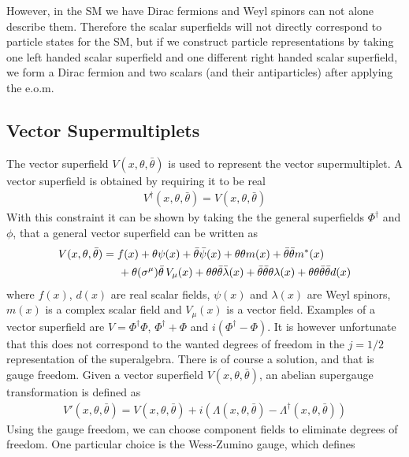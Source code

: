 However, in the SM we have Dirac fermions and Weyl spinors can not alone describe them. Therefore the scalar superfields will not directly correspond to particle states for the SM, but if we construct particle representations by taking one left handed scalar superfield and one different right handed scalar superfield, we form a Dirac fermion and two scalars (and their antiparticles) after applying the e.o.m.

\subsection{Vector Supermultiplets}
The vector superfield $V(x,\theta,\bar{\theta})$ is used to represent the vector supermultiplet. A vector superfield is obtained by requiring it to be real
\begin{align}
    V^{\dagger}(x,\theta,\bar{\theta})=V(x,\theta,\bar{\theta})
\end{align}
With this constraint it can be shown by taking the the general superfields $\Phi^{\dagger}$ and $\phi$, that a general vector superfield can be written as
\begin{align*}
    V(x,\theta,\bar{\theta})&=f(x)+\theta\psi(x)+\bar{\theta}\bar{\psi}(x)+\theta\theta m(x)+\bar{\theta}\bar{\theta}m^{*}(x)
    \\
    &\hspace{0.5cm}+\theta(\sigma^{\mu})\Bar{\theta} \,V_{\mu}(x)+\theta\theta\bar{\theta}\bar{\lambda}(x)+\bar{\theta}\bar{\theta}\theta\lambda(x)+\theta\theta\bar{\theta}\bar{\theta}d(x)
\end{align*}
where $f(x)$, $d(x)$ are real scalar fields, $\psi(x)$ and $\lambda(x)$ are Weyl spinors, $m(x)$ is a complex scalar field and $V_{\mu}(x)$ is a vector field. Examples of a vector superfield are $V=\Phi^{\dagger}\Phi$, $\Phi^{\dagger}+\Phi$ and $i(\Phi^{\dagger}-\Phi)$. It is however unfortunate that this does not correspond to the wanted degrees of freedom in the $j=1/2$ representation of the superalgebra. There is of course a solution, and that is gauge freedom. Given a vector superfield $V(x,\theta,\bar{\theta})$, an abelian supergauge transformation is defined as
\begin{align}
    V'(x,\theta,\bar{\theta})=V(x,\theta,\bar{\theta})+i(\Lambda(x,\theta,\bar{\theta})-\Lambda^{\dagger}(x,\theta,\bar{\theta}))
\end{align}
Using the gauge freedom, we can choose component fields to eliminate degrees of freedom. One particular choice is the Wess-Zumino gauge, which defines
